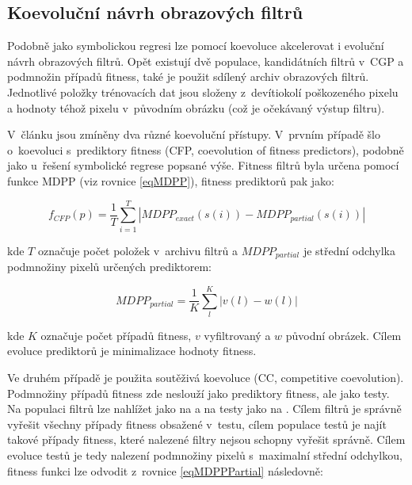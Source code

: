 \subsection{Koevoluční návrh obrazových filtrů}
\label{secCoevIF}

Podobně jako symbolickou regresi lze pomocí koevoluce akcelerovat i evoluční návrh obrazových filtrů. Opět existují dvě populace, kandidátních filtrů v~CGP a podmnožin případů fitness, také je použit sdílený archiv obrazových filtrů. Jednotlivé položky trénovacích dat jsou složeny z~devítiokolí poškozeného pixelu a hodnoty téhož pixelu v~původním obrázku (což je očekávaný výstup filtru).

V~článku \cite{SikuPPSN} jsou zmíněny dva různé koevoluční přístupy. V~prvním případě šlo o~koevoluci s~prediktory fitness (CFP, coevolution of fitness predictors), podobně jako u~řešení symbolické regrese popsané výše. Fitness filtrů byla určena pomocí funkce MDPP (viz rovnice \ref{eqMDPP}), fitness prediktorů pak jako:

\begin{equation}
    \label{eqFpredictorIF}
    f_{\mathit{CFP}} \left( p \right) = \frac{1}{T} \sum\limits_{i=1}^{T} \left| \mathit{MDPP_{exact}} \left( s \left( i \right) \right) - \mathit{MDPP_{partial}} \left( s \left( i \right) \right) \right|
\end{equation}

\noindent{}kde $T$ označuje počet položek v~archivu filtrů a $\mathit{MDPP_{partial}}$ je střední odchylka podmnožiny pixelů určených prediktorem:

\begin{equation}
    \label{eqMDPPPartial}
    \mathit{MDPP_{partial}} = \frac{1}{K} \sum\limits_l^K \left| v\left( l \right) - w\left( l \right) \right|
\end{equation}

\noindent{}kde $K$ označuje počet případů fitness, $v$ vyfiltrovaný a $w$ původní obrázek. Cílem evoluce prediktorů je minimalizace hodnoty fitness.

Ve druhém případě je použita soutěživá koevoluce (CC, competitive coevolution). Podmnožiny případů fitness zde neslouží jako prediktory fitness, ale jako testy. Na populaci filtrů lze nahlížet jako na  a na testy jako na . Cílem filtrů je správně vyřešit všechny případy fitness obsažené v~testu, cílem populace testů je najít takové případy fitness, které nalezené filtry nejsou schopny vyřešit správně.
Cílem evoluce testů je tedy nalezení podmnožiny pixelů s~maximalní střední odchylkou, fitness funkci lze odvodit z~rovnice \ref{eqMDPPPartial} následovně:

